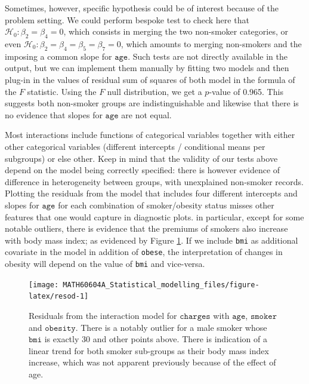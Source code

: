 \documentclass[
  11pt,
  letterpaper,
]{book}
\theoremstyle{definition}
\theoremstyle{definition}
\theoremstyle{definition}
\theoremstyle{remark}
\begin{document}
Sometimes, however, specific hypothesis could be of interest because of the problem setting. We could perform bespoke test to check here that \(\mathscr{H}_0: \beta_2=\beta_4=0\), which consists in merging the two non-smoker categories, or even \(\mathscr{H}_0: \beta_2=\beta_4= \beta_5=\beta_7=0\), which amounts to merging non-smokers and the imposing a common slope for \(\texttt{age}\). Such tests are not directly available in the output, but we can implement them manually by fitting two models and then plug-in in the values of residual sum of squares of both model in the formula of the \(F\) statistic. Using the \(F\) null distribution, we get a \(p\)-value of 0.965. This suggests both non-smoker groups are indistinguishable and likewise that there is no evidence that slopes for \(\texttt{age}\) are not equal.

Most interactions include functions of categorical variables together with either other categorical variables (different intercepts / conditional means per subgroups) or else other. Keep in mind that the validity of our tests above depend on the model being correctly specified: there is however evidence of difference in heterogeneity between groups, with unexplained non-smoker records. Plotting the residuals from the model that includes four different intercepts and slopes for \(\texttt{age}\) for each combination of smoker/obesity status misses other features that one would capture in diagnostic plots. in particular, except for some notable outliers, there is evidence that the premiums of smokers also increase with body mass index; as evidenced by Figure \ref{fig:resod}. If we include \texttt{bmi} as additional covariate in the model in addition of \texttt{obese}, the interpretation of changes in obesity will depend on the value of \texttt{bmi} and vice-versa.

\begin{figure}

{\centering \texttt{[image: MATH60604A\_Statistical\_modelling\_files/figure-latex/resod-1]} 

}

\caption{Residuals from the interaction model for $\texttt{charges}$ with $\texttt{age}$, $\texttt{smoker}$ and $\texttt{obesity}$. There is a notably outlier for a male smoker whose $\texttt{bmi}$ is exactly 30 and other points above. There is indication of a linear trend for both smoker sub-groups as their body mass index increase, which was not apparent previously because of the effect of age.}\label{fig:resod}
\end{figure}
\end{document}
